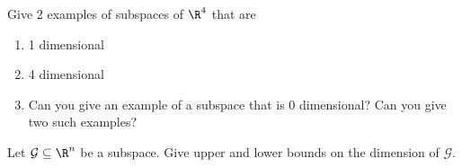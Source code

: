\begin{exercises}
\begin{problist}
		\prob Give 2 examples of subspaces of $\R^4$ that are
		\begin{enumerate}
			\item 1 dimensional
			\item 4 dimensional
			\item Can you give an example of a subspace that is 0 dimensional?
			Can you give two such examples?
		\end{enumerate}

		\prob Let $\mathcal G\subseteq \R^n$ be a subspace.
		Give upper and lower bounds on the dimension of $\mathcal G$.
	\end{problist}
\end{exercises}
